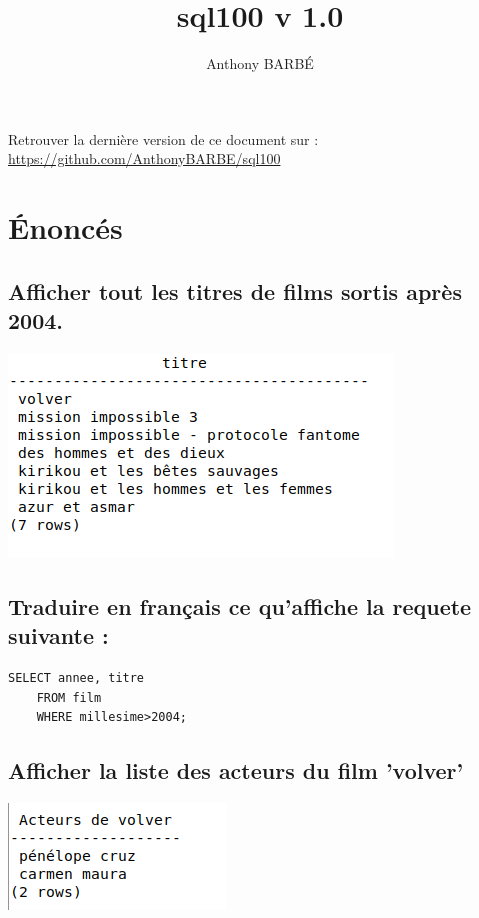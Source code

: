\documentclass[]{scrartcl}
\title{sql100 v 1.0}
\author{Anthony BARBÉ}
\begin{document}
 

\date{}
\maketitle

\begin{center}
	Retrouver la dernière version de ce document sur : \\
	\url{https://github.com/AnthonyBARBE/sql100}
		
\end{center}


\newpage

\section{Énoncés}

\subsection{Afficher tout les titres de films sortis après 2004.}
	\includegraphics[scale=.5]{1}
	

\subsection{Traduire en français ce qu'affiche la requete suivante :}

\begin{lstlisting}[frame=single]  
	SELECT annee, titre 
	FROM film
	WHERE millesime>2004;
\end{lstlisting}

\subsection{Afficher la liste des acteurs du film 'volver'}
	\includegraphics[scale=.5]{3}
\end{document}
